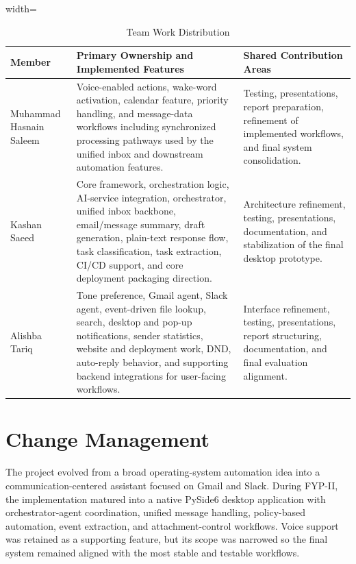 \begin{table}[!htbp]
\centering
\footnotesize
\renewcommand{\arraystretch}{1.15}
\setlength{\tabcolsep}{5pt}
\begin{adjustbox}{width=\textwidth}
\begin{tabular}{|>{\raggedright\arraybackslash}p{3.0cm}|>{\raggedright\arraybackslash}p{6.0cm}|>{\raggedright\arraybackslash}p{5.2cm}|}
\hline
\textbf{Member} & \textbf{Primary Ownership and Implemented Features} & \textbf{Shared Contribution Areas} \\ \hline
Muhammad Hasnain Saleem & Voice-enabled actions, wake-word activation, calendar feature, priority handling, and message-data workflows including synchronized processing pathways used by the unified inbox and downstream automation features. & Testing, presentations, report preparation, refinement of implemented workflows, and final system consolidation. \\ \hline
Kashan Saeed & Core framework, orchestration logic, AI-service integration, orchestrator, unified inbox backbone, email/message summary, draft generation, plain-text response flow, task classification, task extraction, CI/CD support, and core deployment packaging direction. & Architecture refinement, testing, presentations, documentation, and stabilization of the final desktop prototype. \\ \hline
Alishba Tariq & Tone preference, Gmail agent, Slack agent, event-driven file lookup, search, desktop and pop-up notifications, sender statistics, website and deployment work, DND, auto-reply behavior, and supporting backend integrations for user-facing workflows. & Interface refinement, testing, presentations, report structuring, documentation, and final evaluation alignment. \\ \hline
\end{tabular}
\end{adjustbox}
\caption{Team Work Distribution}
\end{table}

\section{Change Management}
The project evolved from a broad operating-system automation idea into a communication-centered assistant focused on Gmail and Slack. During FYP-II, the implementation matured into a native PySide6 desktop application with orchestrator-agent coordination, unified message handling, policy-based automation, event extraction, and attachment-control workflows. Voice support was retained as a supporting feature, but its scope was narrowed so the final system remained aligned with the most stable and testable workflows.

